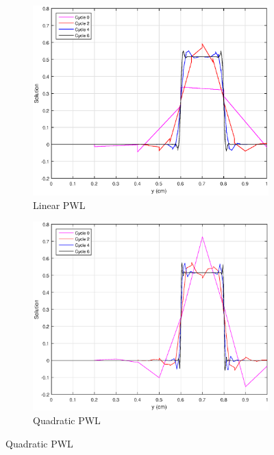 \begin{figure}
\centering
{
	\begin{subfigure}[b]{0.45\textwidth}
		\centering
		\label{subfig::SL_uniform_ef_pwl1}
		\includegraphics[width=\textwidth]{figures/sec_BF/SL_PWLD_k1_uniform.eps}
		\caption{Linear PWL}
	\end{subfigure}
	\hfill
	\begin{subfigure}[b]{0.45\textwidth}
		\centering
		\label{subfig::SL_uniform_ef_pwl2}
		\includegraphics[width=\textwidth]{figures/sec_BF/SL_PWLD_k2_uniform.eps}
		\caption{Quadratic PWL}
	\end{subfigure}
}
\end{figure}
